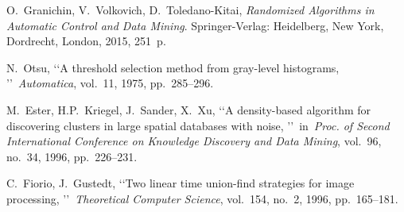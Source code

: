 \documentclass[conference,a4paper,twocolumn]{IEEEtran}
\begin{document}
\begin{thebibliography}{99}
 O.~Granichin, V.~Volkovich, D.~Toledano-Kitai, \emph{Randomized Algorithms in Automatic Control and Data Mining}. Springer-Verlag: Heidelberg, New York, Dordrecht, London, 2015, 251~p.

 N.~Otsu, \lq\lq A threshold selection method from gray-level histograms, \rq\rq~\emph{Automatica}, vol.~11, 1975, pp.~285--296.

 M.~Ester, H.P.~Kriegel, J.~Sander, X.~Xu, \lq\lq A density-based algorithm for discovering clusters in large spatial databases with noise, \rq\rq~in~\emph{Proc. of Second International
Conference on Knowledge Discovery and Data Mining}, vol.~96, no.~34, 1996, pp.~226--231.

 C.~Fiorio, J.~Gustedt, \lq\lq Two linear time union-find strategies for image processing, \rq\rq~\emph{Theoretical Computer Science}, vol.~154, no.~2, 1996, pp.~165--181.

\end{thebibliography}


\end{document}
